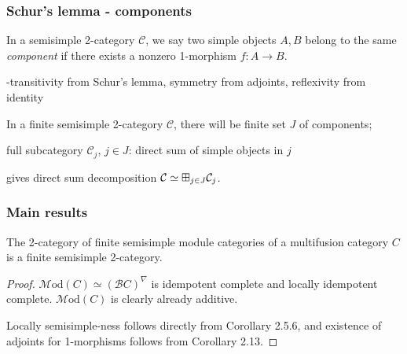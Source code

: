 \documentclass{beamer}
\newcommand{\cB}{{\mathcal{B}}}
\newcommand{\cC}{{\mathcal{C}}}
\newcommand{\bigboxplus}{\Huge \boxplus}
\newcommand{\Mod}{{\mathcal{M}\textrm{od}}}
\newcommand{\ModA}[1]{{\Mod(#1)}}
\begin{document}
\begin{frame}
\frametitle{Schur's lemma - components}


\begin{definition}
In a semisimple 2-category $\cC$,
we say two simple objects $A,B$ belong to the same
\emph{component} if there exists a nonzero 1-morphism
$f: A \to B$.
\end{definition}

\pause

-transitivity from Schur's lemma, symmetry from adjoints,
reflexivity from identity

\pause

In a finite semisimple 2-category $\cC$,
there will be finite set $J$ of components;

\pause

full subcategory $\cC_j$, $j \in J$:
direct sum of simple objects in $j$

\pause

gives direct sum decomposition
$\cC \simeq \bigboxplus_{j \in J} \cC_j$.

\end{frame}


\begin{frame}
\frametitle{Main results}

\begin{theorem}
The 2-category of finite semisimple module categories
of a multifusion category $C$
is a finite semisimple 2-category.
\end{theorem}

\pause

\begin{proof}
$\ModA{C} \simeq (\cB C)^\nabla$ is idempotent complete
and locally idempotent complete.
$\ModA{C}$ is clearly already additive.


Locally semisimple-ness follows directly from
\cite{DSPSb}{Corollary 2.5.6},
and existence of adjoints for 1-morphisms
follows from \cite{DSPSa}{Corollary 2.13}.

\end{proof}

\end{frame}
\end{document}
